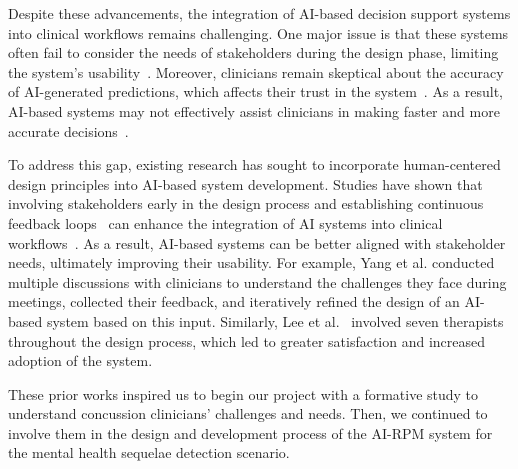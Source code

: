  


Despite these advancements, the integration of AI-based decision support systems into clinical workflows remains challenging. 
One major issue is that these systems often fail to consider the needs of stakeholders during the design phase, limiting the system's  usability~\cite{cai2019hello, green2019principles, khairat2018reasons, lee2020co, romero2020lesson}. %
Moreover, clinicians remain skeptical about the accuracy of AI-generated predictions, which affects their trust in the system~\cite{bohr2020rise, yang2016investigating, elwyn2013many}.
As a result, AI-based systems may not effectively assist clinicians in making faster and more accurate decisions~\cite{antoniadi2021current}.

To address this gap, existing research has sought to incorporate human-centered design principles into AI-based system development. 
Studies have shown that involving stakeholders early in the design process and establishing continuous feedback loops~\cite{abdulaal2021clinical} can enhance the integration of AI systems into clinical workflows~\cite{wang2023human}. 
As a result, AI-based systems can be better aligned with stakeholder needs, ultimately improving their usability.
For example, Yang et al.\cite{sendak2020human} conducted multiple discussions with clinicians to understand the challenges they face during meetings, collected their feedback, and iteratively refined the design of an AI-based system based on this input. 
Similarly, Lee et al.~\cite{lee2020co} involved seven therapists throughout the design process, which led to greater satisfaction and increased adoption of the system.

These prior works inspired us to begin our project with a formative study to understand concussion clinicians' challenges and needs.
Then, we continued to involve them in the design and development process of the AI-RPM system for the mental health sequelae detection scenario.

